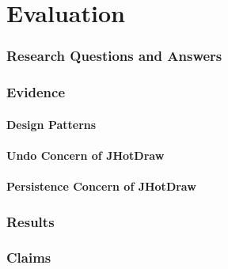 \chapter{Evaluation}\label{Evaluation}

\subsection{Research Questions and Answers}\label{Research Questions and Answers}

\subsection{Evidence}\label{Evidence}

\subsubsection{Design Patterns}\label{Design Patterns JHotDraw}

\subsubsection{Undo Concern of JHotDraw}\label{Undo JHotDraw}

\subsubsection{Persistence Concern of JHotDraw}\label{Persistence JHotDraw}

\subsection{Results}\label{Results}

\subsection{Claims}\label{Claims}